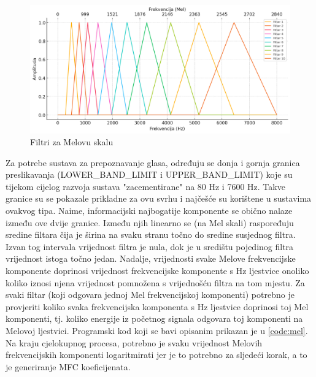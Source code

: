 \begin{figure}[htb]
    \centering
    \includegraphics[width=0.8\linewidth]{Chapters/struktura_sustava/generiranje_znacajki/melfiltar.png} 
    \caption{Filtri za Melovu skalu}
    \label{pic:melfilter}
\end{figure}

Za potrebe sustava za prepoznavanje glasa, određuju se donja i gornja granica preslikavanja 
(LOWER\_BAND\_LIMIT i UPPER\_BAND\_LIMIT) koje su tijekom cijelog razvoja sustava "zacementirane"
na 80 Hz i 7600 Hz. Takve granice su se pokazale prikladne za ovu svrhu i najčešće
su korištene u sustavima ovakvog tipa. Naime, informacijski najbogatije komponente
se obično nalaze između ove dvije granice. Između njih linearno se (na Mel skali) raspoređuju sredine filtara čija je širina na svaku stranu 
točno do sredine susjednog filtra. Izvan tog intervala vrijednost filtra je nula, dok je u središtu
pojedinog filtra vrijednost istoga točno jedan. Nadalje, vrijednosti svake Melove frekvencijske
komponente doprinosi vrijednost frekvencijske komponente s Hz ljestvice onoliko koliko iznosi
njena vrijednost pomnožena s vrijednošću filtra na tom mjestu. Za svaki filtar (koji odgovara
jednoj Mel frekvencijskoj komponenti) potrebno je provjeriti koliko svaka frekvencijska komponenta 
s Hz ljestvice doprinosi toj Mel komponenti, tj. koliko energije iz početnog signala
odgovara toj komponenti na Melovoj ljestvici. Programski kod koji se bavi opisanim prikazan je u 
\ref{code:mel}. Na kraju cjelokupnog procesa, potrebno je svaku vrijednost Melovih frekvencijskih
komponenti logaritmirati jer je to potrebno za sljedeći korak, a to je generiranje MFC koeficijenata.

